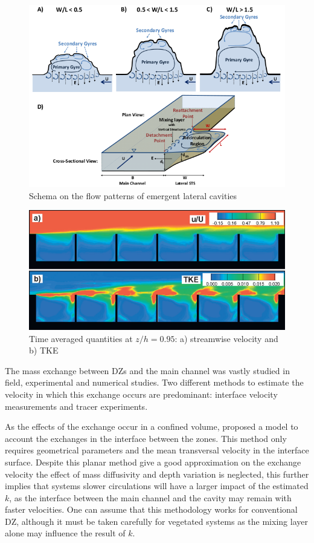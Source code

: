 \begin{figure}[!ht]
\centering
\includegraphics[width=0.9\linewidth]{../images/introduction/lateralCavitySchema.png}
\caption{Schema on the flow patterns of emergent lateral cavities \cite{jackson2013}}
\label{fig:lCavitySchema}
\end{figure}

\begin{figure}[!ht]
\centering
\includegraphics[width=0.9\linewidth]{../images/introduction/groyneStabilisation.png}
\caption{Time averaged quantities at $z/h=0.95$: a) streamwise velocity and b) TKE \cite{mcCoy2008}}
\label{fig:groyneStabilisation}
\end{figure}

The mass exchange between DZs and the main channel was vastly studied in field, experimental and numerical studies. Two different methods to estimate the velocity in which this exchange occurs are predominant: interface velocity measurements and tracer experiments.

As the effects of the exchange occur in a confined volume, \textcite{weitbrecht2001} proposed a model to account the exchanges in the interface between the zones. This method only requires geometrical parameters and the mean transversal velocity in the interface surface. Despite this planar method give a good approximation on the exchange velocity the effect of mass diffusivity and depth variation is neglected,  this further implies that systems slower circulations will have a larger impact of the estimated $k$, as the interface between the main channel and the cavity may remain with faster velocities. One can assume that this methodology works for conventional DZ, although it must be taken carefully for vegetated systems as the mixing layer alone may influence the result of $k$. 

